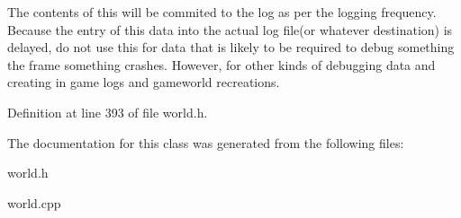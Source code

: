 The contents of this will be commited to the log as per the logging frequency. Because the entry of this data into the actual log file(or whatever destination) is delayed, do not use this for data that is likely to be required to debug something the frame something crashes. However, for other kinds of debugging data and creating in game logs and gameworld recreations. 

Definition at line 393 of file world.h.



The documentation for this class was generated from the following files:\begin{DoxyCompactItemize}
\item 
world.h\item 
world.cpp\end{DoxyCompactItemize}
